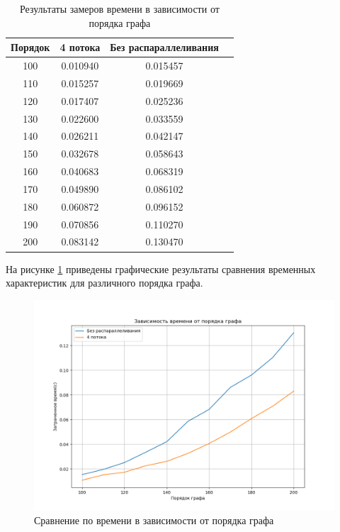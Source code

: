 \begin{table}[h]
    \begin{center}
        \begin{threeparttable}
        \captionsetup{justification=raggedright,singlelinecheck=off}
        \caption{Результаты замеров времени в зависимости от порядка графа}
        \label{tbl:time_order}
        \begin{tabular}{|c|c|c|c|}
            \hline
            Порядок & 4 потока & Без распараллеливания \\
            \hline
            100 & 0.010940 & 0.015457 \\ \hline  
            110 & 0.015257 & 0.019669 \\ \hline
            120 & 0.017407 & 0.025236 \\ \hline
            130 & 0.022600 & 0.033559 \\ \hline 
            140 & 0.026211 & 0.042147 \\ \hline 
            150 & 0.032678 & 0.058643 \\ \hline 
            160 & 0.040683 & 0.068319 \\ \hline 
            170 & 0.049890 & 0.086102 \\ \hline 
            180 & 0.060872 & 0.096152 \\ \hline
            190 & 0.070856 & 0.110270 \\ \hline 
            200 & 0.083142 & 0.130470 \\ \hline
		\end{tabular}
    \end{threeparttable}
\end{center}
\end{table}

На рисунке \ref{img:order} приведены графические результаты сравнения временных характеристик для различного порядка графа.

\begin{figure}[H]
	\begin{center}
		\includegraphics[scale=0.5]{img/order.png}
	\end{center}
	\captionsetup{justification=centering}
	\caption{Сравнение по времени в зависимости от порядка графа}
	\label{img:order}
\end{figure}

